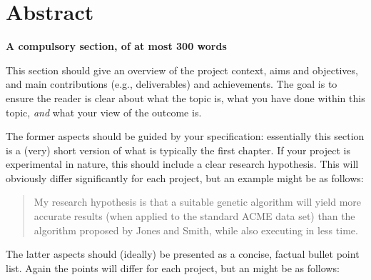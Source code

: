\documentclass[ oneside,%
                    author={Michael Wray},
                    degree={BSc},
                     title={Some Structural Guidelines for CS Project Dissertations \\ With a Second Line Added to the Title},
                    unit={COMS30045},
                    subtitle={And Even A Fancy Subtitle}]{dissertation}
\begin{document}

\frontmatter





\chapter*{Abstract}

{\bf A compulsory section, of at most 300 words} 
\vspace{1cm} 

\noindent
This section should give an overview of the project context, aims and
objectives, and main contributions (e.g., deliverables) and achievements.  The
goal is to ensure the reader is clear about what the topic is, what you have
done within this topic, {\em and} what your view of the outcome is.

The former aspects should be guided by your specification: essentially 
this section is a (very) short version of what is typically the first 
chapter. If your project is experimental in nature, this should include 
a clear research hypothesis.  This will obviously differ significantly
for each project, but an example might be as follows:

\begin{quote}
My research hypothesis is that a suitable genetic algorithm will yield
more accurate results (when applied to the standard ACME data set) than 
the algorithm proposed by Jones and Smith, while also executing in less
time.
\end{quote}

\noindent
The latter aspects should (ideally) be presented as a concise, factual 
bullet point list.  Again the points will differ for each project, but 
an might be as follows:
\end{document}
